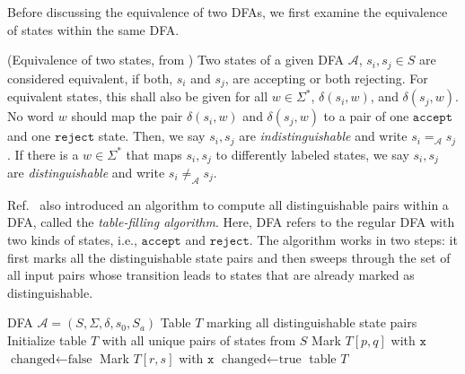 \documentclass[../main.tex]{subfiles}
\begin{document}
Before discussing the equivalence of two DFAs, we first examine the equivalence of states within the same \ac{DFA}.

\begin{definition}\label{def:equivstate} (Equivalence of two states, from \cite{hopcroft2001introduction}) 
    Two states of a given \ac{DFA} $\mathcal{A}$, $s_i, s_j \in S$ are considered equivalent, if both, $s_i$ and $s_j$, are accepting or both rejecting. For equivalent states, this shall also be given for all $w \in \Sigma^*$, $\delta(s_i,w)$, and $\delta(s_j,w)$. No word $w$ should map the pair $\delta(s_i,w)$ and $\delta(s_j,w)$ to a pair of one $\mathtt{accept}$ and one $\mathtt{reject}$  state. Then, we say  $s_i, s_j$ are \textit{indistinguishable} and write $s_i =_{\mathcal{A}} s_j$. If there is a $w \in \Sigma^*$ that maps $s_i, s_j$ to differently labeled states, we say  $s_i, s_j$ are \textit{distinguishable} and write $s_i \neq_{\mathcal{A} }s_j$. 
\end{definition}

Ref.~\cite{hopcroft2001introduction} also introduced an algorithm to compute all distinguishable pairs within a \ac{DFA}, called the \textit{table-filling algorithm}. Here, \ac{DFA} refers to the regular DFA with two kinds of states, i.e., $\mathtt{accept}$ and $\mathtt{reject}$. The algorithm works in two steps: it first marks all the distinguishable state pairs and then sweeps through the set of all input pairs whose transition leads to states that are already marked as distinguishable. 

\begin{algorithm}[H]

\caption{Table-filling~(adopted from~\cite{hopcroft2001introduction})}\label{algo:tablefilling}
    \begin{algorithmic}[1]
    
\REQUIRE DFA $\mathcal{A} = (S, \Sigma, \delta, s_0, S_a)$
\ENSURE Table $T$ marking all distinguishable state pairs
\STATE Initialize table $T$ with all unique pairs of states from $S$
        \STATE Mark $T[p,q]$ with $\mathtt{x}$
    \ENDIF
\ENDFOR
\REPEAT
    \STATE $\text{changed} \leftarrow \text{false}$
                    \STATE Mark $T[r,s]$ with $\mathtt{x}$
                    \STATE $\text{changed} \leftarrow \text{true}$
                \ENDIF
            \ENDFOR
        \ENDFOR
    \ENDFOR
{}
\STATE \RETURN table $T$

    \end{algorithmic}
\end{algorithm}
\end{document}
